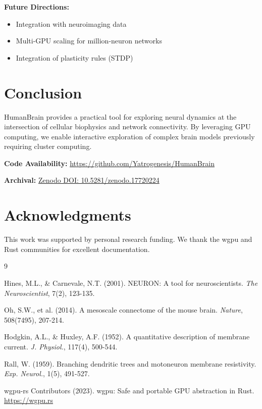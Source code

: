 \documentclass[11pt,twocolumn]{article}
\begin{document}
\textbf{Future Directions:}
\begin{itemize}
    \item Integration with neuroimaging data
    \item Multi-GPU scaling for million-neuron networks
    \item Integration of plasticity rules (STDP)
\end{itemize}

\section{Conclusion}

HumanBrain provides a practical tool for exploring neural dynamics at the intersection of cellular biophysics and network connectivity. By leveraging GPU computing, we enable interactive exploration of complex brain models previously requiring cluster computing.

\textbf{Code Availability:} \url{https://github.com/Yatrogenesis/HumanBrain}

\textbf{Archival:} \href{https://doi.org/10.5281/zenodo.17720224}{Zenodo DOI: 10.5281/zenodo.17720224}

\section*{Acknowledgments}
This work was supported by personal research funding. We thank the wgpu and Rust communities for excellent documentation.

\begin{thebibliography}{9}

Hines, M.L., \& Carnevale, N.T. (2001).
NEURON: A tool for neuroscientists.
\textit{The Neuroscientist}, 7(2), 123-135.

Oh, S.W., et al. (2014).
A mesoscale connectome of the mouse brain.
\textit{Nature}, 508(7495), 207-214.

Hodgkin, A.L., \& Huxley, A.F. (1952).
A quantitative description of membrane current.
\textit{J. Physiol.}, 117(4), 500-544.

Rall, W. (1959).
Branching dendritic trees and motoneuron membrane resistivity.
\textit{Exp. Neurol.}, 1(5), 491-527.

wgpu-rs Contributors (2023).
wgpu: Safe and portable GPU abstraction in Rust.
\url{https://wgpu.rs}

\end{thebibliography}
\end{document}
